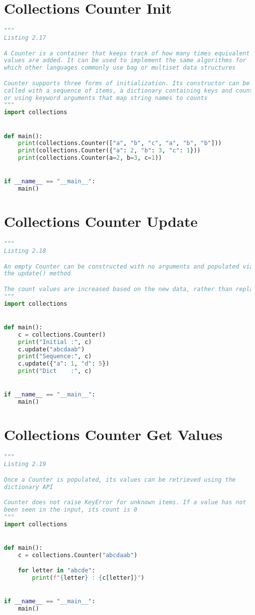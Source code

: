 \documentclass[a4paper,landscape]{report}
\begin{document}
\section{Collections Counter Init}
\begin{lstlisting}[language=Python]
"""
Listing 2.17

A Counter is a container that keeps track of how many times equivalent
values are added. It can be used to implement the same algorithms for
which other languages commonly use bag or multiset data structures

Counter supports three forms of initialization. Its constructor can be
called with a sequence of items, a dictionary containing keys and counts
or using keyword arguments that map string names to counts
"""
import collections


def main():
    print(collections.Counter(["a", "b", "c", "a", "b", "b"]))
    print(collections.Counter({"a": 2, "b": 3, "c": 1}))
    print(collections.Counter(a=2, b=3, c=1))


if __name__ == "__main__":
    main()

\end{lstlisting}
\section{Collections Counter Update}
\begin{lstlisting}[language=Python]
"""
Listing 2.18

An empty Counter can be constructed with no arguments and populated via
the update() method

The count values are increased based on the new data, rather than replaced
"""
import collections


def main():
    c = collections.Counter()
    print("Initial :", c)
    c.update("abcdaab")
    print("Sequence:", c)
    c.update({"a": 1, "d": 5})
    print("Dict    :", c)


if __name__ == "__main__":
    main()

\end{lstlisting}
\section{Collections Counter Get Values}
\begin{lstlisting}[language=Python]
"""
Listing 2.19

Once a Counter is populated, its values can be retrieved using the
dictionary API

Counter does not raise KeyError for unknown items. If a value has not
been seen in the input, its count is 0
"""
import collections


def main():
    c = collections.Counter("abcdaab")

    for letter in "abcde":
        print(f"{letter} : {c[letter]}")


if __name__ == "__main__":
    main()

\end{lstlisting}
\end{document}
